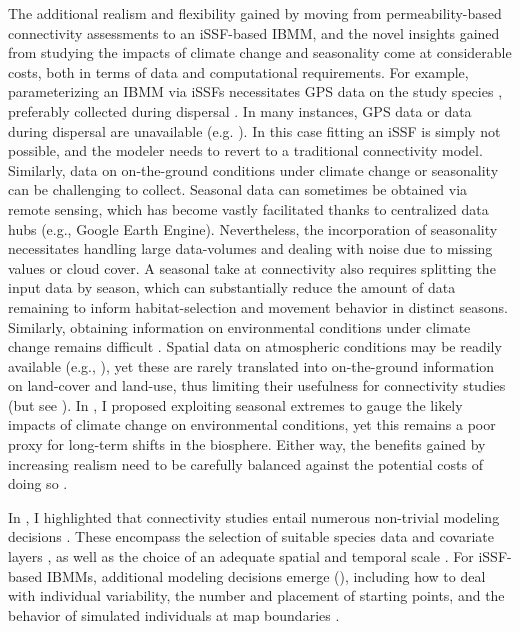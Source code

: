 \documentclass[../FinalThesis.tex]{subfiles}
\begin{document}
The additional realism and flexibility gained by moving from permeability-based
connectivity assessments to an iSSF-based IBMM, and the novel insights gained
from studying the impacts of climate change and seasonality come at considerable
costs, both in terms of data and computational requirements. For example,
parameterizing an IBMM via iSSFs necessitates GPS data on the study species
\citep{Fortin.2005, Thurfjell.2014, Avgar.2016}, preferably collected during
dispersal \citep{Elliot.2014}. In many instances, GPS data or data during
dispersal are unavailable (e.g. \citealp{Jackson.2016, Day.2019, Day.2020}). In
this case fitting an iSSF is simply not possible, and the modeler needs to
revert to a traditional connectivity model. Similarly, data on on-the-ground
conditions under climate change or seasonality can be challenging to collect.
Seasonal data can sometimes be obtained via remote sensing, which has become
vastly facilitated thanks to centralized data hubs (e.g., Google Earth Engine).
Nevertheless, the incorporation of seasonality necessitates handling large
data-volumes and dealing with noise due to missing values or cloud cover. A
seasonal take at connectivity also requires splitting the input data by season,
which can substantially reduce the amount of data remaining to inform
habitat-selection and movement behavior in distinct seasons. Similarly,
obtaining information on environmental conditions under climate change remains
difficult \citep{Littlefield.2019}. Spatial data on atmospheric conditions may
be readily available (e.g., \citealp{CopernicusClimateChangeService.2021}), yet
these are rarely translated into on-the-ground information on land-cover and
land-use, thus limiting their usefulness for connectivity studies (but see
\citealp{Sleeter.2018}). In , I proposed exploiting seasonal
extremes to gauge the likely impacts of climate change on environmental
conditions, yet this remains a poor proxy for long-term shifts in the biosphere.
Either way, the benefits gained by increasing realism need to be carefully
balanced against the potential costs of doing so \citep{Puy.2022}.

In , I highlighted that connectivity studies entail
numerous non-trivial modeling decisions \citep{Beier.2008}. These encompass the
selection of suitable species data and covariate layers \citep{Elliot.2014,
Fattebert.2015, Finerty.2023}, as well as the choice of an adequate spatial and
temporal scale \citep{Zeller.2014, Zeller.2017, Ciudad.2021}. For iSSF-based
IBMMs, additional modeling decisions emerge (),
including how to deal with individual variability, the number and placement of
starting points, and the behavior of simulated individuals at map boundaries
\citep{Diniz.2019}.
\end{document}
